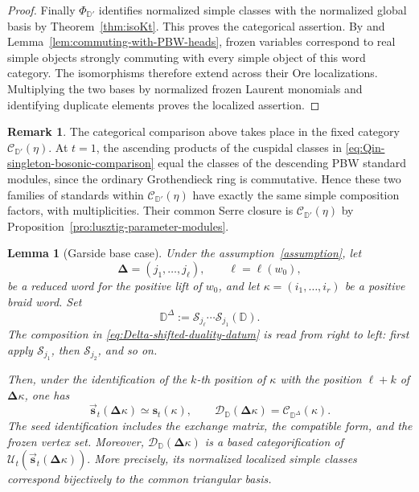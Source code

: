 \documentclass[12pt, reqno]{amsart}
\theoremstyle{plain}
\newtheorem{lemma}[theorem]{Lemma}
\theoremstyle{definition}
\newtheorem{remark}[theorem]{Remark}
\numberwithin{equation}{section}
\newcommand{\DD}{\mathbb{D}}
\begin{document}
\begin{proof}
Finally \(\Phi_{\DD'}\) identifies normalized simple classes with
the normalized global basis by Theorem~\ref{thm:isoKt}.
This proves the categorical assertion.  By \cite[Lemma~5.12]{kashiwara2025monoidal} and
Lemma~\ref{lem:commuting-with-PBW-heads}, frozen variables
correspond to real simple objects strongly commuting with every
simple object of this word category.  The isomorphisms therefore extend across their Ore
localizations.  Multiplying the two bases by normalized frozen
Laurent monomials and identifying duplicate elements proves the
localized assertion.
\end{proof}

\begin{remark}
The categorical comparison above takes place in the fixed
category \(\mathscr C_{\DD'}(\eta)\).
At \(t=1\), the ascending products of the cuspidal classes in
\eqref{eq:Qin-singleton-bosonic-comparison} equal the classes of the
descending PBW standard modules, since the ordinary Grothendieck
ring is commutative.  Hence these two families of standards within
\(\mathscr C_{\DD'}(\eta)\) have exactly the same simple
composition factors, with multiplicities.  Their common Serre
closure is \(\mathscr C_{\DD'}(\eta)\) by
Proposition~\ref{pro:lusztig-parameter-modules}.
\end{remark}

\begin{lemma}[Garside base case]
\label{lem:Garside-base-case}
Under the assumption~\ref{assumption}, let
\[
    \boldsymbol{\Delta}=(j_1,\ldots,j_\ell),
    \qquad
    \ell=\ell(w_0),
\]
be a reduced word for the positive lift of \(w_0\), and let
\(\kappa=(i_1,\ldots,i_r)\) be a positive braid word. Set
\begin{equation}\label{eq:Delta-shifted-duality-datum}
    \DD^\Delta
    :=
    \mathscr S_{j_\ell}\cdots
    \mathscr S_{j_1}(\DD).
\end{equation}
The composition in \eqref{eq:Delta-shifted-duality-datum} is read
from right to left: first apply \(\mathscr S_{j_1}\), then
\(\mathscr S_{j_2}\), and so on.

Then, under the identification of the \(k\)-th position of
\(\kappa\) with the position \(\ell+k\) of
\(\boldsymbol{\Delta}\kappa\), one has
\begin{equation}\label{eq:Delta-kappa-base-identification}
    \overrightarrow{\mathbf s}_t
    (\boldsymbol{\Delta}\kappa)
    \simeq
    \mathbf s_t(\kappa),
    \qquad
    \mathscr D_{\DD}(\boldsymbol{\Delta}\kappa)
    =
    \mathscr C_{\DD^\Delta}(\kappa).
\end{equation}
The seed identification includes the exchange matrix, the compatible
form, and the frozen vertex set. Moreover,
\(\mathscr D_{\DD}(\boldsymbol{\Delta}\kappa)\) is a based
categorification of
\(
    \mathcal U_t\left(
        \overrightarrow{\mathbf s}_t
        (\boldsymbol{\Delta}\kappa)
    \right).
\)
More precisely, its normalized localized simple classes correspond
bijectively to the common triangular basis.
\end{lemma}
\end{document}
